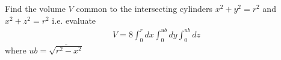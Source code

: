 \example{}

Find the volume $V$ common to the intersecting cylinders $x^2 + y^2 
= r^2$ and $x^2 + z^2 = r^2$ i.e. evaluate
\begin{eqnarray*}
V = 8 \int^r_0 dx \int^{ub}_0 dy \int^{ub}_0 dz
\end{eqnarray*}
where $ub = \overline{\sqrt { r^2 - x^2}}$



